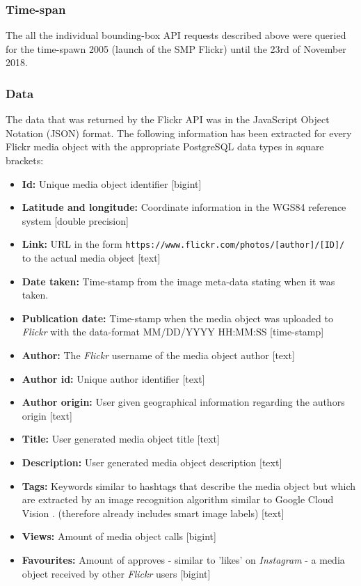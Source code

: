 \subsubsection{Time-span} \label{flickr_timespan}
The all the individual bounding-box API requests described above were queried for the time-spawn 2005 (launch of the SMP Flickr) until the 23rd of November 2018. 
\subsubsection{Data} \label{flickr_data}
The data that was returned by the Flickr API was in the JavaScript Object Notation (JSON) format. The following information has been extracted for every Flickr media object with the appropriate PostgreSQL data types in square brackets:\\

\begin{itemize}[label={}]
    \item \textbf{Id:} Unique media object identifier [bigint]
    \item \textbf{Latitude and longitude:} Coordinate information in the WGS84 reference system [double precision]
    \item \textbf{Link:} URL in the form \texttt{https://www.flickr.com/photos/[author]/[ID]/} to the actual media object [text]
    \item \textbf{Date taken:} Time-stamp from the image meta-data stating when it was taken. 
    \item \textbf{Publication date:} Time-stamp when the media object was uploaded to \textit{Flickr} with the data-format MM/DD/YYYY HH:MM:SS [time-stamp]
    \item \textbf{Author:} The \textit{Flickr} username of the media object author [text]
    \item \textbf{Author id:} Unique author identifier [text] 
    \item \textbf{Author origin:} User given geographical information regarding the authors origin [text]
    \item \textbf{Title:} User generated media object title [text]
    \item \textbf{Description:} User generated media object description [text]
    \item \textbf{Tags:} Keywords similar to \textInstagram hashtags that describe the media object but which are extracted by an image recognition algorithm similar to Google Cloud Vision \parencite{Flickr2019}. (therefore already includes smart image labels) [text]
    \item \textbf{Views:} Amount of media object calls [bigint]
    \item \textbf{Favourites:} Amount of approves - similar to 'likes' on \textit{Instagram} - a media object received by other \textit{Flickr} users [bigint]
\end{itemize}

